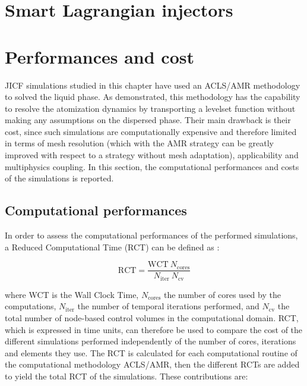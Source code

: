 \section{Smart Lagrangian injectors}
\label{sec:ch5_learning_SLI}




\section{Performances and cost}
\label{subsec:ch5_computational_performances}

JICF simulations studied in this chapter have used an ACLS/AMR methodology to solved the liquid phase. As demonstrated, this methodology has the capability to resolve the atomization dynamics by transporting a levelset function without making any assumptions on the dispersed phase. Their main drawback is their cost, since such simulations are computationally expensive and therefore limited in terms of mesh resolution (which with the AMR strategy can be greatly improved with respect to a strategy without mesh adaptation), applicability and multiphysics coupling. In this section, the computational performances and costs of the simulations is reported. 

\subsection{Computational performances}

In order to assess the computational performances of the performed simulations, a Reduced Computational Time (RCT) can be defined as :

\begin{equation}
\mathrm{RCT} = \frac{\mathrm{WCT} ~ N_\mathrm{cores}}{N_\mathrm{iter}~N_\mathrm{cv}}
\end{equation}

where WCT is the Wall Clock Time, $N_\mathrm{cores}$ the number of cores used by the computations, $N_\mathrm{iter}$ the number of temporal iterations performed, and $N_\mathrm{cv}$ the total number of node-based control volumes in the computational domain. RCT, which is expressed in time units, can therefore be used to compare the cost of the different simulations performed independently of the number of cores, iterations and elements they use. The RCT is calculated for each computational routine of the computational methodology ACLS/AMR, then the different RCTs are added to yield the total RCT of the simulations. These contributions are:

